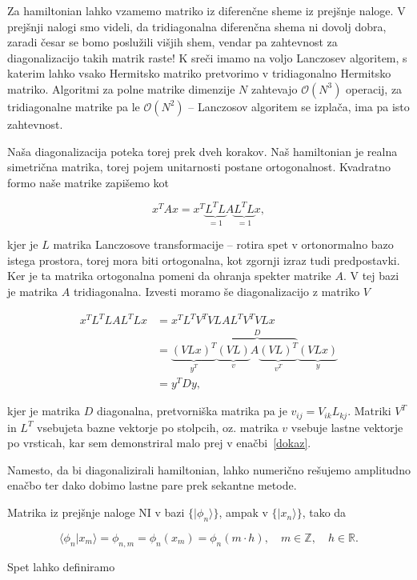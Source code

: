 \documentclass[a4 paper, 12pt]{article}
\begin{document}
Za hamiltonian lahko vzamemo matriko iz diferenčne sheme iz prejšnje naloge. V prejšnji nalogi smo videli, da
tridiagonalna diferenčna shema ni dovolj dobra, zaradi česar se bomo poslužili višjih shem, vendar pa zahtevnost
za diagonalizacijo takih matrik raste! K sreči imamo na voljo Lanczosev algoritem, s katerim lahko vsako Hermitsko matriko
pretvorimo v tridiagonalno Hermitsko matriko. Algoritmi za polne matrike dimenzije $N$ zahtevajo $\mathcal{O}(N^3)$
operacij, za tridiagonalne matrike pa le $\mathcal{O}(N^2)$ -- Lanczosov algoritem se izplača, ima pa isto zahtevnost.

Naša diagonalizacija poteka torej prek dveh korakov. Naš hamiltonian je realna simetrična matrika, torej pojem
unitarnosti postane ortogonalnost. Kvadratno formo naše matrike zapišemo kot

\[
	x^TAx = x^T \underbrace{L^T L}_{= 1} A \underbrace{L^T L}_{= 1} x,
\]

kjer je $L$ matrika Lanczosove transformacije -- rotira spet v ortonormalno bazo istega prostora, torej mora biti ortogonalna, kot zgornji
izraz tudi predpostavki. Ker je ta matrika ortogonalna pomeni da ohranja spekter matrike $A$. V tej bazi je matrika $A$ tridiagonalna.
Izvesti moramo še diagonalizacijo z matriko $V$

\begin{align*}
	x^T L^T L A L^T L x &= x^T L^T V^T V L A L^T V^T V L x \\
		&= \underbrace{(VLx)^T}_{y^T} \overbrace{\underbrace{(VL)}_{v} A \underbrace{(VL)^T}_{v^T}}^{D} \underbrace{(VLx)}_{y} \\
		&= y^T D y,
\end{align*}

kjer je matrika $D$ diagonalna, pretvorniška matrika pa je $v_{ij} = V_{ik}L_{kj}$. Matriki $V^T$ in $L^T$ vsebujeta bazne
vektorje po stolpcih, oz. matrika $v$ vsebuje lastne vektorje po vrsticah, kar sem demonstriral malo prej v
enačbi~\eqref{dokaz}.

Namesto, da bi diagonalizirali hamiltonian, lahko numerično rešujemo amplitudno enačbo ter dako dobimo lastne pare prek
sekantne metode.

Matrika iz prejšnje naloge NI v bazi $\big\{|\phi_n\rangle\big\}$, ampak v $\big\{|x_n\rangle\big\}$, tako da

\[
	\langle \phi_n | x_m \rangle = \phi_{n,m} = \phi_n (x_m) = \phi_n (m \cdot h), \quad m \in \mathbb{Z}, \quad h \in \mathbb{R}.
\]

Spet lahko definiramo
\end{document}
